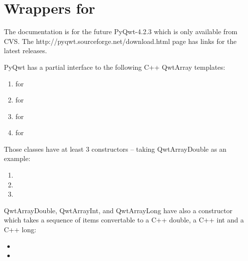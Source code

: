 \documentclass{manual}
\newcommand{\Download}{\ulink{download}
  {http://pyqwt.sourceforge.net/download.html}}
\newcommand{\Future}{
  \begin{notice}[warning]
    The documentation is for the future PyQwt-4.2.3 which is only available
    from CVS. The \Download{} page has links for the latest releases.
  \end{notice}
}
\begin{document}
\section{Wrappers for  \label{qwtarray}}

\Future{}

PyQwt has a partial interface to the following C++ QwtArray templates:
\begin{enumerate}
\item
   for 
\item
   for 
\item
   for 
\item
   for 
\end{enumerate}

Those classes have at least 3 constructors -- taking QwtArrayDouble as an
example:
\begin{enumerate}
\item
\item
\item
\end{enumerate}

QwtArrayDouble, QwtArrayInt, and QwtArrayLong have also a constructor which
takes a sequence of items convertable to a C++ double, a C++ int and a C++
long:
\begin{itemize}
\item
\item
\end{itemize}
\end{document}
